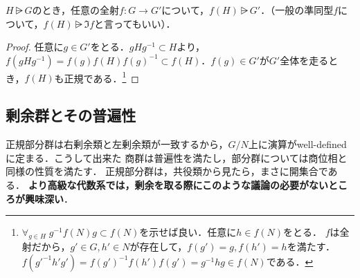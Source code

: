 \documentclass[uplatex,dvipdfmx]{jsreport}
\begin{document}
\begin{proposition}\label{prop-image-functor-preserve-regularity}
    $H\rsub G$のとき，任意の全射$f:G\to G'$について，$f(H)\rsub G'$．（一般の準同型$f$について，$f(H)\rsub\Im f$と言ってもいい）．
\end{proposition}
\begin{proof}
    任意に$g\in G'$をとる．$gHg^{-1}\subset H$より，$f(gHg^{-1})=f(g)f(H)f(g)^{-1}\subset f(H)$．$f(g)\in G'$が$G'$全体を走るとき，$f(H)$も正規である．\footnote{$\forall_{g\in H}\;g^{-1}f(N)g\subset f(N)$を示せば良い．任意に$h\in f(N)$をとる．
    $f$は全射だから，$g'\in G,h'\in N$が存在して，$f(g')=g,f(h')=h$を満たす．
    $f(g'^{-1}h'g')=f(g')^{-1}f(h')f(g')=g^{-1}hg\in f(N)$である．}
\end{proof}

\subsection{剰余群とその普遍性}

\begin{tcolorbox}[colframe=ForestGreen, colback=ForestGreen!10!white,breakable,colbacktitle=ForestGreen!40!white,coltitle=black,fonttitle=\bfseries\sffamily,
title=]
    正規部分群は右剰余類と左剰余類が一致するから，$G/N$上に演算がwell-definedに定まる．こうして出来た
    商群は普遍性を満たし，部分群については商位相と同様の性質を満たす．
    正規部分群は，共役類から見たら，まさに開集合である．
    \textbf{より高級な代数系では，剰余を取る際にこのような議論の必要がないところが興味深い}．
\end{tcolorbox}
\end{document}
